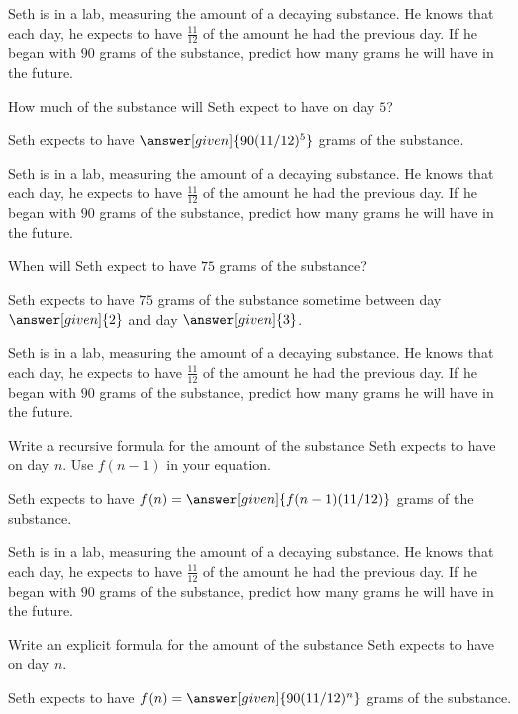 \documentclass[nooutcomes]{ximera}
\begin{document}
\begin{problem}
Seth is in a lab, measuring the amount of a decaying substance.  He knows that each day, he expects to have $\frac{11}{12}$ of the amount he had the previous day.  If he began with $90$ grams of the substance, predict how many grams he will have in the future.

How much of the substance will Seth expect to have on day $5$?
\begin{prompt}
Seth expects to have $\answer[given]{90(11/12)^{5}}$ grams of the substance.
\end{prompt}

\end{problem}



\begin{problem}
Seth is in a lab, measuring the amount of a decaying substance.  He knows that each day, he expects to have $\frac{11}{12}$ of the amount he had the previous day.  If he began with $90$ grams of the substance, predict how many grams he will have in the future.

When will Seth expect to have $75$ grams of the substance?
\begin{prompt}
Seth expects to have $75$ grams of the substance sometime between day $\answer[given]{2}$ and day $\answer[given]{3}$.
\end{prompt}

\end{problem}




\begin{problem}
Seth is in a lab, measuring the amount of a decaying substance.  He knows that each day, he expects to have $\frac{11}{12}$ of the amount he had the previous day.  If he began with $90$ grams of the substance, predict how many grams he will have in the future.

Write a recursive formula for the amount of the substance Seth expects to have on day $n$.  Use $f(n-1)$ in your equation.
\begin{prompt}
Seth expects to have $f(n) = \answer[given]{f(n-1)(11/12)}$ grams of the substance.
\end{prompt}

\end{problem}




\begin{problem}
Seth is in a lab, measuring the amount of a decaying substance.  He knows that each day, he expects to have $\frac{11}{12}$ of the amount he had the previous day.  If he began with $90$ grams of the substance, predict how many grams he will have in the future.

Write an explicit formula for the amount of the substance Seth expects to have on day $n$.
\begin{prompt}
Seth expects to have $f(n) = \answer[given]{90(11/12)^n}$ grams of the substance.
\end{prompt}

\end{problem}
\end{document}
